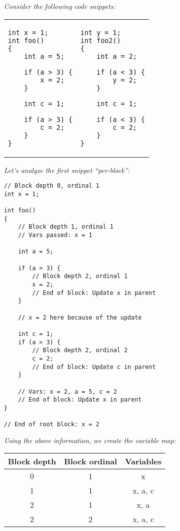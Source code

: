 \begin{exmp}
\bigskip
\textit{Consider the following code snippets:}

\begin{tabular}{ p{4.5cm} p{4.5cm} }
\begin{lstlisting}
int x = 1;
int foo()
{
    int a = 5;

    if (a > 3) {
        x = 2;
    }

    int c = 1;

    if (a > 3) {
        c = 2;
    }
}
\end{lstlisting}
&
\begin{lstlisting}
int y = 1;
int foo2()
{
    int a = 2;

    if (a < 3) {
        y = 2;
    }

    int c = 1;

    if (a < 3) {
        c = 2;
    }
}
\end{lstlisting}
\end{tabular}

\bigskip
\textit{Let's analyze the first snippet ``per-block'':}
\bigskip

\begin{lstlisting}
// Block depth 0, ordinal 1
int x = 1;

int foo()
{
    // Block depth 1, ordinal 1
    // Vars passed: x = 1

    int a = 5;

    if (a > 3) {
        // Block depth 2, ordinal 1
        x = 2;
        // End of block: Update x in parent
    }

    // x = 2 here because of the update

    int c = 1;
    if (a > 3) {
        // Block depth 2, ordinal 2
        c = 2;
        // End of block: Update c in parent
    }

    // Vars: x = 2, a = 5, c = 2
    // End of block: Update x in parent
}

// End of root block: x = 2
\end{lstlisting}

\bigskip
\textit{Using the above information, we create the variable map:}
\bigskip

\begin{table}[H]
\centering
\begin{tabular}{ | c | c | c |}
    \hline
    Block depth & Block ordinal & Variables \\
    \hline
    0 & 1 & x \\
    1 & 1 & x, a, c \\
    2 & 1 & x, a \\
    2 & 2 & x, a, c \\
    \hline
\end{tabular}
\end{table}


\end{exmp}
